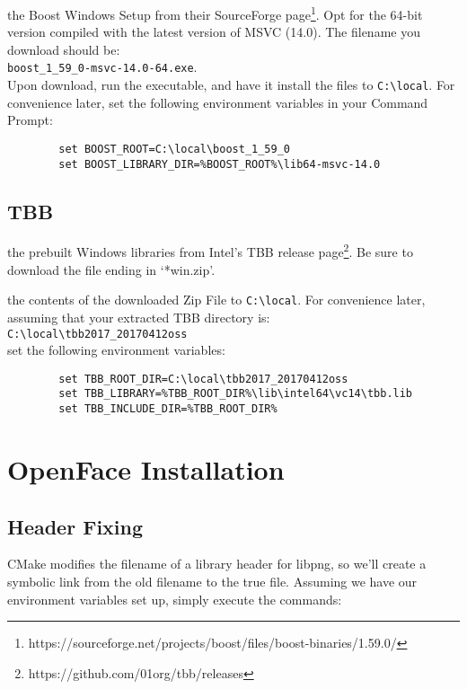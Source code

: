 \documentclass{tufte-handout}
\begin{document}
     the Boost Windows Setup from their SourceForge 
    page\footnote{https://sourceforge.net/projects/boost/files/boost-binaries/1.59.0/}.  Opt for
    the 64-bit version compiled with the latest version of MSVC (14.0).  The filename you download
    should be:\\ \Verb|boost_1_59_0-msvc-14.0-64.exe|.\\  Upon download, run the executable, and 
    have it install the files to \Verb|C:\local|.  For convenience later,
    set the following environment variables in your Command Prompt:

    \begin{lstlisting}
        set BOOST_ROOT=C:\local\boost_1_59_0
        set BOOST_LIBRARY_DIR=%BOOST_ROOT%\lib64-msvc-14.0
    \end{lstlisting}

\subsection{TBB}

     the prebuilt Windows libraries from Intel's TBB release 
    page\footnote{https://github.com/01org/tbb/releases}.  Be sure to download the file ending
    in `*win.zip'.

     the contents of the downloaded Zip File to \Verb|C:\local|.  For
    convenience later, assuming that your extracted TBB directory is: \\
    \Verb|C:\local\tbb2017_20170412oss| \\
    set the following environment variables:

    \begin{lstlisting}
        set TBB_ROOT_DIR=C:\local\tbb2017_20170412oss
        set TBB_LIBRARY=%TBB_ROOT_DIR%\lib\intel64\vc14\tbb.lib
        set TBB_INCLUDE_DIR=%TBB_ROOT_DIR%
    \end{lstlisting}
        
\section{OpenFace Installation}

    \subsection{Header Fixing}
        
        CMake modifies the filename of a library header for libpng, so we'll
        create a symbolic link from the old filename to the true file.
        Assuming we have our environment variables set up, simply execute the
        commands:
\end{document}
